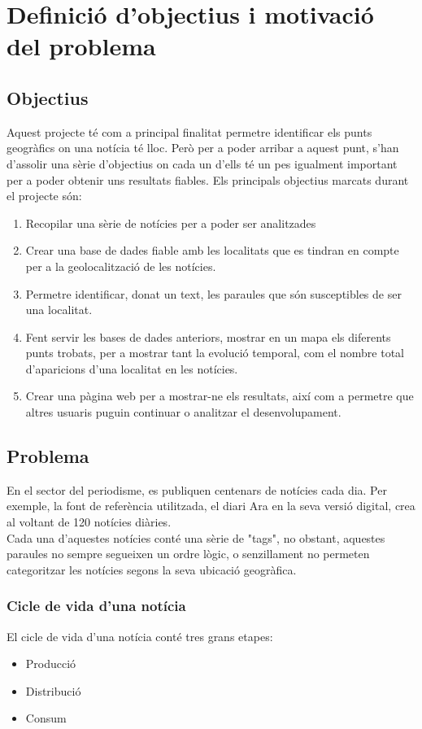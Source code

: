 \documentclass[12pt,a4paper,openright,oneside]{article}
\numberwithin{equation}{section}
\theoremstyle{definition}
\begin{document}
\newpage

\section{Definició d'objectius i motivació del problema}
\subsection{Objectius}
Aquest projecte té com a principal finalitat permetre identificar els punts geogràfics on una notícia té lloc. Però per a poder arribar a aquest punt, s'han d'assolir una sèrie d'objectius on cada un d'ells té un pes igualment important per a poder obtenir uns resultats fiables. Els principals objectius marcats durant el projecte són:
\begin{enumerate}
\item Recopilar una sèrie de notícies per a poder ser analitzades
\item Crear una base de dades fiable amb les localitats que es tindran en compte per a la geolocalització de les notícies.
\item Permetre identificar, donat un text, les paraules que són susceptibles de ser una localitat.
\item Fent servir les bases de dades anteriors, mostrar en un mapa els diferents punts trobats, per a mostrar tant la evolució temporal, com el nombre total d'aparicions d'una localitat en les notícies.
\item Crear una pàgina web per a mostrar-ne els resultats, així com a permetre que altres usuaris puguin continuar o analitzar el desenvolupament.
\end{enumerate}
\subsection{Problema}
En el sector del periodisme, es publiquen centenars de notícies cada dia. Per exemple, la font de referència utilitzada, el diari Ara en la seva versió digital, crea al voltant de 120 notícies diàries.\\
Cada una d'aquestes notícies conté una sèrie de "tags", no obstant, aquestes paraules no sempre segueixen un ordre lògic, o senzillament no permeten categoritzar les notícies segons la seva ubicació geogràfica.
\subsubsection{Cicle de vida d'una notícia}
El cicle de vida d'una notícia conté tres grans etapes:
\begin{itemize}
\item Producció
\item Distribució
\item Consum
\end{itemize}
\newpage
\end{document}
